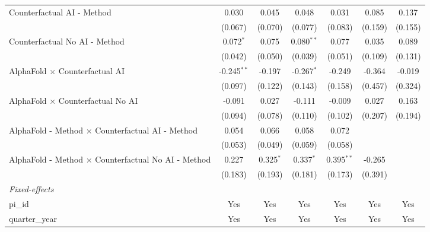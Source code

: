 \begin{tabular}{lcccccc}
   Counterfactual AI - Method                                 & 0.030         & 0.045         & 0.048         & 0.031         & 0.085   & 0.137\\   
                                                              & (0.067)       & (0.070)       & (0.077)       & (0.083)       & (0.159) & (0.155)\\   
   Counterfactual No AI - Method                              & 0.072$^{*}$   & 0.075         & 0.080$^{**}$  & 0.077         & 0.035   & 0.089\\   
                                                              & (0.042)       & (0.050)       & (0.039)       & (0.051)       & (0.109) & (0.131)\\   
   AlphaFold $\times$ Counterfactual AI                       & -0.245$^{**}$ & -0.197        & -0.267$^{*}$  & -0.249        & -0.364  & -0.019\\   
                                                              & (0.097)       & (0.122)       & (0.143)       & (0.158)       & (0.457) & (0.324)\\   
   AlphaFold $\times$ Counterfactual No AI                    & -0.091        & 0.027         & -0.111        & -0.009        & 0.027   & 0.163\\   
                                                              & (0.094)       & (0.078)       & (0.110)       & (0.102)       & (0.207) & (0.194)\\   
   AlphaFold - Method $\times$ Counterfactual AI - Method     & 0.054         & 0.066         & 0.058         & 0.072         &         &   \\   
                                                              & (0.053)       & (0.049)       & (0.059)       & (0.058)       &         &   \\   
   AlphaFold - Method $\times$ Counterfactual No AI - Method  & 0.227         & 0.325$^{*}$   & 0.337$^{*}$   & 0.395$^{**}$  & -0.265  &   \\   
                                                              & (0.183)       & (0.193)       & (0.181)       & (0.173)       & (0.391) &   \\   
   \midrule
   \emph{Fixed-effects}\\
   pi\_id                                                     & Yes           & Yes           & Yes           & Yes           & Yes     & Yes\\  
   quarter\_year                                              & Yes           & Yes           & Yes           & Yes           & Yes     & Yes\\  

\end{tabular}
